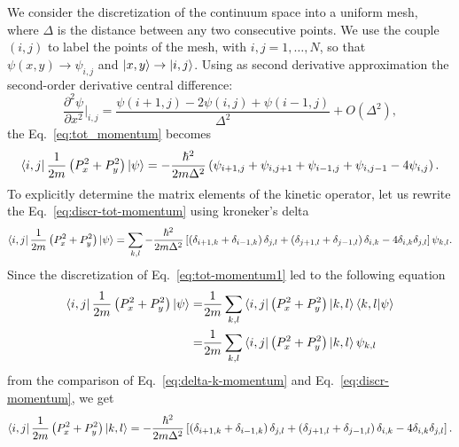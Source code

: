 We consider the discretization of the continuum space into a uniform mesh, where $\Delta$ is the distance between any two consecutive points. We use the couple $(i,j)$ to label the points of the mesh, with $i,j = 1,\ldots , N$, so that $\psi(x,y) \rightarrow \psi_{i,j}$ and $\ket{x,y} \rightarrow \ket{i,j}$. Using as second derivative approximation the  second-order derivative central difference:
\begin{equation}
\frac{\partial^2 \psi}{\partial x^2} \bigg|_{i,j} = \frac{\psi(i+1,j) - 2 \psi(i,j) + \psi(i-1,j)}{\Delta^2} + O(\Delta^2),
\end{equation}
the Eq.~\eqref{eq:tot_momentum} becomes
\begin{equation} \label{eq:discr-tot-momentum}
\bra{i,j} \frac{1}{2m} \left( P_x^2 + P_y^2 \right) \ket{\psi} = -\frac{\hbar^2}{2m\Delta^2} \left( \psi_{i+1,j} + \psi_{i,j+1} + \psi_{i-1,j} + \psi_{i,j-1} - 4 \psi_{i,j} \right).
\end{equation}
To explicitly determine the matrix elements of the kinetic operator, let us rewrite the Eq.~\eqref{eq:discr-tot-momentum} using kroneker's delta
\begin{equation} \label{eq:delta-k-momentum}
\bra{i,j} \frac{1}{2m} \left( P_x^2 + P_y^2 \right) \ket{\psi} = \sum_{k,l} -\frac{\hbar^2}{2m\Delta^2} \left[ \left( \delta_{i+1,k} + \delta_{i-1,k} \right) \delta_{j,l} + \left( \delta_{j+1,l} + \delta_{j-1,l} \right) \delta_{i,k} - 4 \delta_{i,k} \delta_{j,l} \right] \psi_{k,l}.
\end{equation}
Since the discretization of Eq.~\eqref{eq:tot-momentum1} led to the following equation
\begin{subequations}
\begin{align}
\bra{i,j} \frac{1}{2m} \left( P_x^2 + P_y^2 \right) \ket{\psi} = & \frac{1}{2m} \sum_{k,l} \bra{i,j} \left( P_x^2 + P_y^2 \right) \ket{k,l} \braket{k,l|\psi} \\
= & \frac{1}{2m} \sum_{k,l} \bra{i,j} \left( P_x^2 + P_y^2 \right) \ket{k,l} \psi_{k,l} \label{eq:discr-momentum}
\end{align}
\end{subequations}
from the comparison of Eq.~\eqref{eq:delta-k-momentum} and Eq.~\eqref{eq:discr-momentum}, we get
\begin{equation} \label{eq:delta-kroneker}
\bra{i,j} \frac{1}{2m} \left( P_x^2 + P_y^2 \right) \ket{k,l} = -\frac{\hbar^2}{2m\Delta^2} \left[ \left( \delta_{i+1,k} + \delta_{i-1,k} \right) \delta_{j,l} + \left( \delta_{j+1,l} + \delta_{j-1,l} \right) \delta_{i,k} - 4 \delta_{i,k} \delta_{j,l} \right].
\end{equation}

